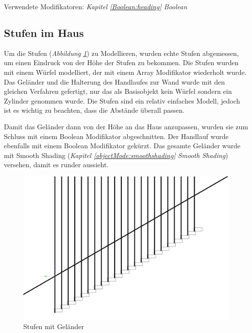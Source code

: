 Verwendete Modifikatoren: \textit{Kapitel \ref{Boolean:heading} \dq Boolean\dq}

\subsection{Stufen im Haus}
\label{Stufen_Im_Haus:Heading}
Um die Stufen (\textit{Abbildung \ref{Stufen_Im_Haus:Bild}}) zu Modellieren, wurden echte Stufen abgemessen, um einen Eindruck von der Höhe der Stufen zu bekommen.
Die Stufen wurden mit einem Würfel modelliert, der mit einem Array Modifikator wiederholt wurde. Das Geländer und die Halterung des Handlaufes zur Wand
wurde mit den gleichen Verfahren gefertigt, nur das als Basisobjekt kein Würfel sondern ein Zylinder genommen wurde.
Die Stufen sind ein relativ einfaches Modell, jedoch ist es wichtig zu beachten, dass die Abstände überall passen.

Damit das Geländer dann von der Höhe an das Haus anzupassen, wurden sie zum Schluss mit einem Boolean Modifikator abgeschnitten.
Der Handlauf wurde ebenfalls mit einem Boolean Modifikator gekürzt. Das gesamte Geländer wurde mit Smooth Shading (\textit{Kapitel \ref{objectMode:smoothshading} \dq Smooth Shading\dq})
versehen, damit es runder aussieht.

\begin{figure}[H]
     \centering
     \includegraphics[width=.8\textwidth]{images/Stufen-Haus_Stufen.png}
     \caption{Stufen mit Geländer}
     \label{Stufen_Im_Haus:Bild}
\end{figure}


